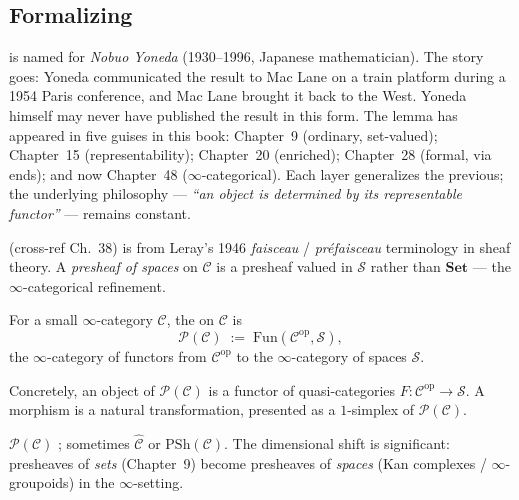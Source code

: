 \subsection{Formalizing}

\begin{nameorigin}
 is named for \emph{Nobuo Yoneda} (1930--1996,
Japanese mathematician). The story goes: Yoneda communicated the
result to Mac Lane on a train platform during a 1954 Paris conference,
and Mac Lane brought it back to the West. Yoneda himself may never
have published the result in this form. The lemma has appeared in five
guises in this book: Chapter~9 (ordinary, set-valued); Chapter~15
(representability); Chapter~20 (enriched); Chapter~28 (formal, via
ends); and now Chapter~48 ($\infty$-categorical). Each layer
generalizes the previous; the underlying philosophy — \emph{``an object
is determined by its representable functor''} — remains constant.
\end{nameorigin}

\begin{nameorigin}
 (cross-ref Ch.~38) is from Leray's 1946 \emph{faisceau} /
\emph{préfaisceau} terminology in sheaf theory. A \emph{presheaf of
spaces} on $\mathcal{C}$ is a presheaf valued in $\mathcal{S}$ rather
than $\mathbf{Set}$ — the $\infty$-categorical refinement.
\end{nameorigin}

\begin{definition}
\label{def:presheaves}
For a small $\infty$-category $\mathcal{C}$, the
 on $\mathcal{C}$ is
\begin{equation*}
  \mathcal{P}(\mathcal{C}) \;:=\; \mathrm{Fun}(\mathcal{C}^{\mathrm{op}}, \mathcal{S}),
\end{equation*}
the $\infty$-category of functors from $\mathcal{C}^{\mathrm{op}}$ to the
$\infty$-category of spaces $\mathcal{S}$.

Concretely, an object of $\mathcal{P}(\mathcal{C})$ is a functor of
quasi-categories $F : \mathcal{C}^{\mathrm{op}} \to \mathcal{S}$. A
morphism is a natural transformation, presented as a $1$-simplex of
$\mathcal{P}(\mathcal{C})$.
\end{definition}

\begin{howtosay}
$\mathcal{P}(\mathcal{C})$ ; sometimes $\widehat{\mathcal{C}}$ or $\mathrm{PSh}(\mathcal{C})$.
The dimensional shift is significant: presheaves of \emph{sets} (Chapter~9)
become presheaves of \emph{spaces} (Kan complexes / $\infty$-groupoids)
in the $\infty$-setting.
\end{howtosay}

